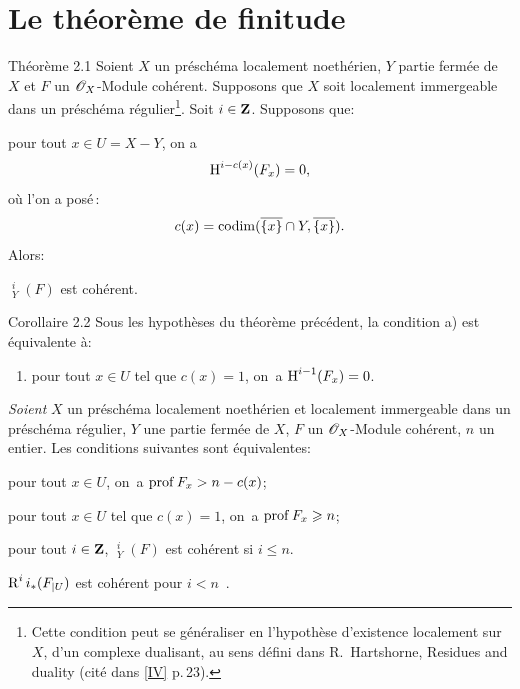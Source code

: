 \section{Le th\'eor\`eme de finitude} \label{VIII.2}

\label{VIII.2.1}
\begin{enonce*}{Th\'eor\`eme 2.1\ndemark}
Soient $X$ un pr\'esch\'ema localement noeth\'erien, $Y$ partie ferm\'ee de $X$ et $F$ un $\mathscr{O}_X$-Module coh\'erent.
Supposons que $X$ soit localement immergeable dans un pr\'esch\'ema r\'egulier\footnote{Cette condition peut se g\'en\'eraliser en l'hypoth\`ese d'existence localement sur $X$, d'un \og complexe dualisant\fg, au sens d\'efini dans R.\, Hartshorne, Residues and duality (cit\'e dans \Exp \ref{IV} p.\,23).}. Soit $i\in\mathbf{Z}$. Supposons que:
\begin{enumeratea}
\item
pour tout $x\in U=X-Y$, on a
\[
\operatorname{H}^{i-c(x)}({F}_x)=0,
\]
o\`u l'on a pos\'e\,:
\begin{equation} \label{eq:VIII.2.1} c(x)=\operatorname{codim} (\overline{\{x\}}\cap Y, \overline{\{x\}}).
\end{equation}
Alors:
\item
$\mathop{\underline{\mathrm{H}}}\nolimits^i_Y(F)$ est coh\'erent.
\end{enumeratea}
\end{enonce*}

\label{VIII.2.2}
\begin{enonce*}{Corollaire 2.2\ndemark}
Sous les hypoth\`eses du th\'eor\`eme pr\'ec\'edent, la condition \textup{a)} est \'equivalente \`a:

\begin{enumerate}
\item[\textup{c)}] pour tout $x\in U$ tel que $c(x)=1$, on~a $\operatorname{H}^{i-1}(F_x)=0$.
\end{enumerate}
\end{enonce*}

\begin{corollaire} \label{VIII.2.3} \emph{Soient} $X$ un pr\'esch\'ema localement noeth\'erien et localement immergeable dans un pr\'esch\'ema r\'egulier, $Y$ une partie ferm\'ee de $X$, $F$ un $\mathscr{O}_X$-Module coh\'erent, $n$ un entier. Les conditions suivantes sont \'equivalentes:
\begin{enumeratei}
\item
pour tout $x\in U$, on~a $\operatorname{prof} F_x>n-c(x)$;
\item
pour tout $x\in U$ tel que $c(x)=1$, on~a $\operatorname{prof} F_x\geqslant n$;
\item
pour tout $i\in \mathbf{Z}$, $\mathop{\underline{\mathrm{H}}}\nolimits^i_Y(F)$ est coh\'erent si $i\leq n$.
\item
$\operatorname{R}^ii_\ast(F_{|U})$ est coh\'erent pour $i<n$\ .
\end{enumeratei}
\end{corollaire}

